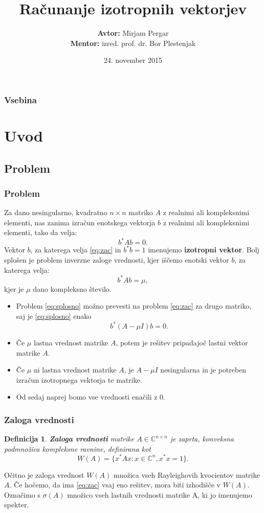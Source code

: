 \documentclass{beamer}
\title[Računanje izotropnih vektorjev] %
{Računanje izotropnih vektorjev}
\author[Mirjam Pergar] %
{\textbf{Avtor:}  Mirjam Pergar\\
\textbf{Mentor:} izred. prof. dr. Bor Plestenjak
}
\institute[Fakuleta za matematiko in fiziko] %
{

}
\date[24. november 2015] %
{24. november 2015}
\newcommand{\C}{\mathbb C}
\newtheorem{definicija}[izrek]{Definicija}
\begin{document}
\begin{frame}
  \titlepage
\end{frame}

\begin{frame}
  \frametitle{Vsebina}
  \tableofcontents[pausesections]
\end{frame}


\section{Uvod}
\subsection{Problem}
\begin{frame}
  \frametitle{Problem}
\begin{alertblock}{}
Za dano nesingularno, kvadratno $n \times n$ matriko $A$ z realnimi ali kompleksnimi elementi, nas zanima izračun enotskega vektorja $b$ z realnimi ali kompleksnimi elementi, tako da velja:
\begin{equation}\label{eq:zac}
b^\ast Ab=0.
\end{equation}
Vektor $b$, za katerega velja \eqref{eq:zac} in $b^\ast b=1$  imenujemo \textbf{izotropni vektor}. 
Bolj splošen je problem inverzne zaloge vrednosti, kjer iščemo enotski vektor $b$, za katerega velja:
\begin{equation}\label{eq:splosno}
b^\ast Ab=\mu,
\end{equation}
kjer je $\mu$ dano kompleksno število.
\end{alertblock}
\end{frame}
\begin{frame}
\begin{itemize}
\item Problem \eqref{eq:splosno} možno prevesti na problem \eqref{eq:zac} za drugo matriko, saj je \eqref{eq:splosno} enako
$$b^\ast (A-\mu I)b=0.$$
\item Če $\mu$ lastna vrednost matrike $A$, potem je rešitev pripadajoč lastni vektor matrike $A$.
\item Če $\mu$ ni lastna vrednost matrike $A$, je $A-\mu I$ nesingularna in je potreben izračun izotropnega vektorja te matrike.
\item Od sedaj naprej bomo vse vrednosti enačili z $0$.
\end{itemize}
\end{frame}
\begin{frame}
\frametitle{Zaloga vrednosti}
\begin{definicija}
\textbf{Zaloga vrednosti} matrike $A \in \C^{n\times n}$ je zaprta, konveksna podmnožica kompleksne ravnine, definirana kot
$$W(A)=\{x^\ast Ax: x \in \C^n, x^\ast x=1\}.$$
\end{definicija}\pause
Očitno je zaloga vrednost $W(A)$ množica vseh Rayleighovih kvocientov matrike $A$. Če hočemo, da ima \eqref{eq:zac} vsaj eno rešitev, mora biti izhodišče v $W(A)$. Označimo s $\sigma(A)$ množico vseh lastnih vrednosti matrike A, ki jo imenujemo spekter.
\end{frame}
\end{document}

